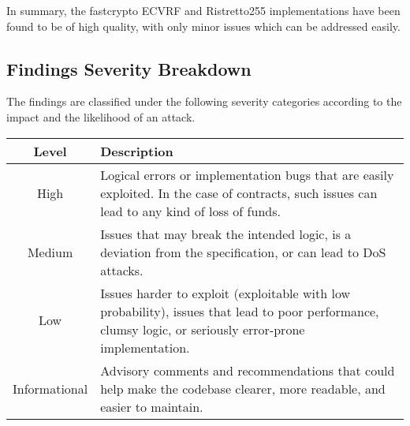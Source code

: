 In summary, the fastcrypto ECVRF and Ristretto255 implementations have been found to be of high quality, with only minor issues which can be addressed easily.

\subsection{Findings Severity Breakdown}
The findings are classified under the following severity categories according to the impact and the likelihood of an attack.
\begin{center}
\begin{tabular}{|| c | p{9cm}||} 
 \hline
 Level & Description \\ [0.5ex] 
 \hline\hline
 High & Logical errors or implementation bugs that are easily exploited. In the case of contracts, such issues can lead to any kind of loss of funds.\\
 \hline
 Medium & Issues that may break the intended logic, is a deviation from the specification, or can lead to DoS attacks.\\
 \hline
 Low & Issues harder to exploit (exploitable with low probability), issues that lead to poor performance, clumsy logic, or seriously error-prone implementation.\\
 \hline
 Informational & Advisory comments and recommendations that could help make the codebase clearer, more readable, and easier to maintain.\\
 \hline
\end{tabular}
\end{center}
